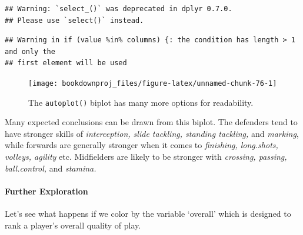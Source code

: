 \documentclass[
]{article}
\newenvironment{Shaded}{\begin{snugshade}}{\end{snugshade}}
\newcommand{\AttributeTok}[1]{\textcolor[rgb]{0.77,0.63,0.00}{#1}}
\newcommand{\DecValTok}[1]{\textcolor[rgb]{0.00,0.00,0.81}{#1}}
\newcommand{\FloatTok}[1]{\textcolor[rgb]{0.00,0.00,0.81}{#1}}
\newcommand{\FunctionTok}[1]{\textcolor[rgb]{0.00,0.00,0.00}{#1}}
\newcommand{\NormalTok}[1]{#1}
\newcommand{\SpecialCharTok}[1]{\textcolor[rgb]{0.00,0.00,0.00}{#1}}
\newcommand{\StringTok}[1]{\textcolor[rgb]{0.31,0.60,0.02}{#1}}
\theoremstyle{definition}
\theoremstyle{definition}
\theoremstyle{definition}
\theoremstyle{definition}
\theoremstyle{remark}
\begin{document}
\begin{verbatim}
## Warning: `select_()` was deprecated in dplyr 0.7.0.
## Please use `select()` instead.
\end{verbatim}

\begin{verbatim}
## Warning in if (value %in% columns) {: the condition has length > 1 and only the
## first element will be used
\end{verbatim}

\begin{figure}

{\centering \texttt{[image: bookdownproj\_files/figure-latex/unnamed-chunk-76-1]} 

}

\caption{The \texttt{autoplot()} biplot has many more options for readability.}\label{fig:unnamed-chunk-76}
\end{figure}

Many expected conclusions can be drawn from this biplot. The defenders tend to have stronger skills of \emph{interception, slide tackling, standing tackling,} and \emph{marking}, while forwards are generally stronger when it comes to \emph{finishing, long.shots, volleys, agility} etc. Midfielders are likely to be stronger with \emph{crossing, passing, ball.control,} and \emph{stamina.}

\hypertarget{further-exploration}{%
\paragraph{Further Exploration}\label{further-exploration}}

Let's see what happens if we color by the variable `overall' which is designed to rank a player's overall quality of play.



\begin{Shaded}
\end{Shaded}
\end{document}
